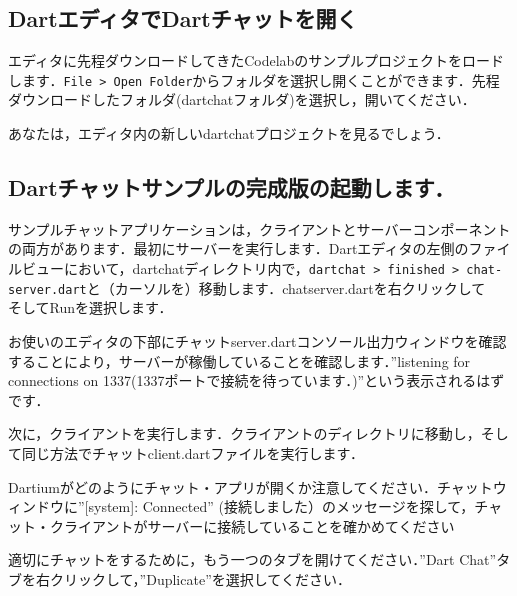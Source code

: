 
\subsection{DartエディタでDartチャットを開く}

エディタに先程ダウンロードしてきたCodelabのサンプルプロジェクトをロードします．\verb|File > Open Folder|からフォルダを選択し開くことができます．先程ダウンロードしたフォルダ(dartchatフォルダ)を選択し，開いてください．


あなたは，エディタ内の新しいdartchatプロジェクトを見るでしょう．


\subsection{Dartチャットサンプルの完成版の起動します．}

サンプルチャットアプリケーションは，クライアントとサーバーコンポーネントの両方があります．最初にサーバーを実行します．Dartエディタの左側のファイルビューにおいて，dartchatディレクトリ内で，\verb|dartchat > finished > chat-server.dart|と（カーソルを）移動します．chatserver.dartを右クリックして　そしてRunを選択します．


お使いのエディタの下部にチャットserver.dartコンソール出力ウィンドウを確認することにより，サーバーが稼働していることを確認します．''listening for connections on 1337(1337ポートで接続を待っています．)''という表示されるはずです．


次に，クライアントを実行します．クライアントのディレクトリに移動し，そして同じ方法でチャットclient.dartファイルを実行します．


Dartiumがどのようにチャット・アプリが開くか注意してください．チャットウィンドウに''[system]: Connected'' (接続しました）のメッセージを探して，チャット・クライアントがサーバーに接続していることを確かめてください


適切にチャットをするために，もう一つのタブを開けてください．''Dart Chat''タブを右クリックして，''Duplicate''を選択してください．


